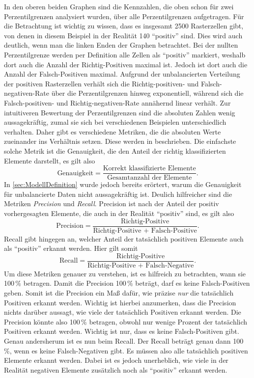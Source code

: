In den oberen beiden Graphen sind die Kennzahlen, die oben schon für zwei Perzentilgrenzen analysiert wurden, über alle Perzentilgrenzen aufgetragen.
Für die Betrachtung ist wichtig zu wissen, dass es insgesamt 2500 Rasterzellen gibt, von denen in diesem Beispiel in der Realität 140 "`positiv"' sind.
Dies wird auch deutlich, wenn man die linken Enden der Graphen betrachtet.
Bei der nullten Perzentilgrenze werden per Definition alle Zellen als "`positiv"' markiert, weshalb dort auch die Anzahl der Richtig-Positiven maximal ist.
Jedoch ist dort auch die Anzahl der Falsch-Positiven maximal.
Aufgrund der unbalancierten Verteilung der positiven Rasterzellen verhält sich die Richtig-positiven- und Falsch-negativen-Rate über die Perzentilgrenzen hinweg exponentiell, während sich die Falsch-positiven- und Richtig-negativen-Rate annähernd linear verhält.
Zur intuitiveren Bewertung der Perzentilgrenzen sind die absoluten Zahlen wenig aussagekräftig, zumal sie sich bei verschiedenen Beispielen unterschiedlich verhalten.
Daher gibt es verschiedene Metriken, die die absoluten Werte zueinander ins Verhältnis setzen.
Diese werden in \cite{ImbalancedData} beschrieben.
Die einfachste solche Metrik ist die Genauigkeit, die den Anteil der richtig klassifizierten Elemente darstellt, es gilt also
$$
\text{Genauigkeit} = \frac{\text{Korrekt klassifizierte Elemente}}{\text{Gesamtanzahl der Elemente}}.
$$
In \autoref{sec:ModellDefinition} wurde jedoch bereits erörtert, warum die Genauigkeit für unbalancierte Daten nicht aussagekräftig ist.
Deulich hilfreicher sind die Metriken \emph{Precision} und \emph{Recall}.
Precision ist nach \cite{ImbalancedData} der Anteil der positiv vorhergesagten Elemente, die auch in der Realität "`positiv"' sind, es gilt also
$$
\text{Precision} = \frac{\text{Richtig-Positive}}{\text{Richtig-Positive + Falsch-Positive}}.
$$
Recall gibt hingegen an, welcher Anteil der tatsächlich positiven Elemente auch als "`positiv"' erkannt werden.
Hier gilt somit
$$
\text{Recall} = \frac{\text{Richtig-Positive}}{\text{Richtig-Positive + Falsch-Negative}}.
$$
Um diese Metriken genauer zu verstehen, ist es hilfreich zu betrachten, wann sie 100\,\% betragen.
Damit die Precision 100\,\% beträgt, darf es keine Falsch-Positiven geben.
Somit ist die Precision ein Maß dafür, wie präzise \emph{nur} die tatsächlich Positiven erkannt werden.
Wichtig ist hierbei anzumerken, dass die Precision nichts darüber aussagt, wie viele der tatsächlich Positiven erkannt werden.
Die Precision könnte also 100\,\% betragen, obwohl nur wenige Prozent der tatsächlich Positiven erkannt werden.
Wichtig ist nur, dass es keine Falsch-Positiven gibt.
Genau andersherum ist es nun beim Recall.
Der Recall beträgt genau dann 100\,\%, wenn es keine Falsch-Negativen gibt.
Es müssen also alle tatsächlich positiven Elemente erkannt werden.
Dabei ist es jedoch unerheblich, wie viele in der Realität negativen Elemente zusätzlich noch als "`positiv"' erkannt werden.

